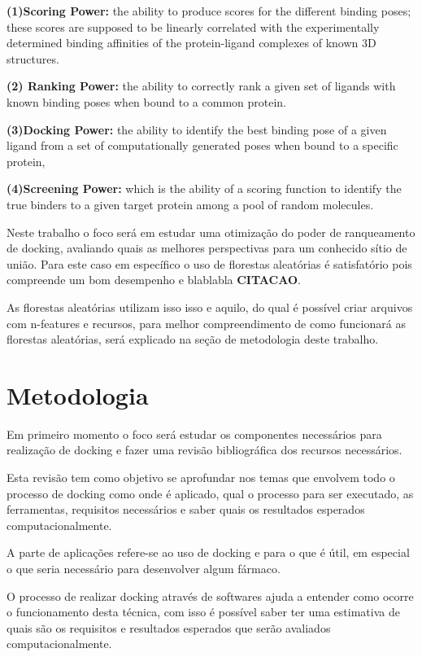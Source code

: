 \documentclass[tcc, capa]{texucpel}
\begin{document}
\textbf{(1)Scoring Power:} the ability to produce scores for the different binding poses; these scores are supposed to be linearly correlated with the experimentally determined binding affinities of the protein-ligand complexes of known 3D structures. 

\textbf{(2) Ranking Power:}
the ability to correctly rank a given set of ligands with known binding poses when bound to a common protein. 

\textbf{(3)Docking Power:} the ability to
identify the best binding pose of a given ligand from a set of computationally
generated poses when bound to a specific protein,

\textbf{(4)Screening Power:}
which is the ability of a scoring function to
identify the true binders to a given target protein among a pool of random
molecules.

Neste trabalho o foco será em estudar uma otimização do poder de ranqueamento de docking, avaliando quais as melhores perspectivas para um conhecido sítio de união.
Para este caso em específico o uso de florestas aleatórias é satisfatório pois compreende um bom desempenho e blablabla \textbf{CITACAO}.

As florestas aleatórias utilizam isso isso e aquilo, do qual é possível criar arquivos com n-features e recursos, para melhor compreendimento de como funcionará as florestas aleatórias, será explicado na seção de metodologia deste trabalho. 


\chapter{Metodologia}
Em primeiro momento o foco será estudar os componentes necessários para realização de docking e  fazer uma revisão bibliográfica dos recursos necessários.

Esta revisão tem como objetivo se aprofundar nos temas que envolvem todo o processo de docking como onde é aplicado, qual o processo para ser executado, as ferramentas, requisitos necessários  e saber quais os resultados esperados computacionalmente.

A parte de aplicações refere-se ao uso de docking e para o que é útil,  em especial o que seria necessário para desenvolver algum fármaco.

O processo de realizar docking através de softwares ajuda a entender como ocorre o funcionamento desta técnica, com isso é possível saber ter uma estimativa de quais são os requisitos e resultados esperados que serão avaliados computacionalmente.
\end{document}

